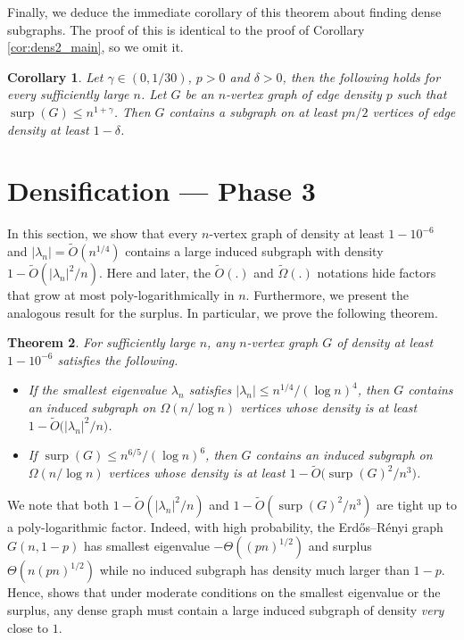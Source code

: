 \documentclass[11pt]{article}
\theoremstyle{plain}
\newtheorem{theorem}{Theorem}[section]
\newtheorem{corollary}[theorem]{Corollary}
\theoremstyle{definition}
\DeclareMathOperator{\surp}{surp}
\begin{document}
Finally, we deduce the immediate corollary of this theorem about finding dense subgraphs. The proof of this is identical to the proof of Corollary \ref{cor:dens2_main}, so we omit it.

\begin{corollary}\label{cor:dens2_main_MaxCut}
Let $\gamma\in (0,1/30)$, $p>0$ and $\delta>0$, then the following holds for every sufficiently large $n$. Let $G$ be an $n$-vertex graph of edge density $p$ such that $\surp(G)\leq n^{1+\gamma}$. Then $G$ contains a subgraph on at least $pn/2$ vertices of edge density at least $1-\delta$.
\end{corollary}


\section{Densification --- Phase 3}\label{sect:dens3}

In this section, we show that every $n$-vertex graph of density at least $1-10^{-6}$ and $|\lambda_n|= \widetilde{O}(n^{1/4})$ contains a large induced subgraph with density $1-\widetilde{O}(|\lambda_n|^2/n)$. Here and later, the $\widetilde{O}(.)$ and $\widetilde{\Omega}(.)$ notations hide factors that grow at most poly-logarithmically in $n$. 
Furthermore, we present the analogous result for the surplus. In particular, we prove the following theorem.

\begin{theorem} \label{theorem:dens3_main}
For sufficiently large $n$, any $n$-vertex graph $G$ of density at least $1-10^{-6}$ satisfies the following.
    \begin{itemize}
        \item[(a)] If the smallest eigenvalue $\lambda_n$ satisfies $|\lambda_n| \le n^{1/4}/(\log n)^4$, then $G$ contains an induced subgraph on $\Omega(n/\log n)$ vertices whose density is at least $1-\widetilde{O}\big(|\lambda_n|^2/n\big)$.
        \item[(b)] If $\surp(G) \leq n^{6/5}/(\log n)^{6}$, then $G$ contains an induced subgraph on $\Omega(n/\log n)$ vertices whose density is at least $1- \widetilde{O}\big(\surp(G)^2/n^3\big)$.
    \end{itemize}
\end{theorem}

We note that both $1-\widetilde{O}(|\lambda_n|^2/n)$ and $1-\widetilde{O}(\surp(G)^2/n^3)$ are tight up to a poly-logarithmic factor.
Indeed, with high probability, the Erd\H{o}s--R\'enyi graph $G(n,1-p)$ has smallest eigenvalue $-\Theta((pn)^{1/2})$ and surplus $\Theta(n(pn)^{1/2})$ while no induced subgraph has density much larger than $1-p$.
Hence,  shows that under moderate conditions on the smallest eigenvalue or the surplus, any dense graph must contain a large induced subgraph of density \textit{very} close to $1$.
\end{document}
